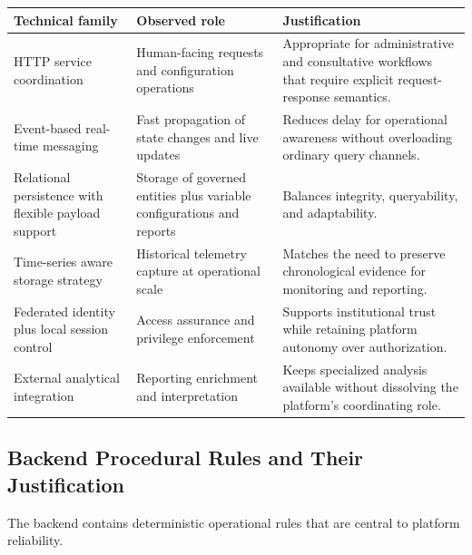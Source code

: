 \documentclass[11pt,a4paper]{article}
\begin{document}
\begin{longtable}{@{}p{}p{}p{}@{}}
\toprule
\textbf{Technical family} & \textbf{Observed role} & \textbf{Justification} \\
\midrule
\endhead
HTTP service coordination & Human-facing requests and configuration operations & Appropriate for administrative and consultative workflows that require explicit request-response semantics. \\
Event-based real-time messaging & Fast propagation of state changes and live updates & Reduces delay for operational awareness without overloading ordinary query channels. \\
Relational persistence with flexible payload support & Storage of governed entities plus variable configurations and reports & Balances integrity, queryability, and adaptability. \\
Time-series aware storage strategy & Historical telemetry capture at operational scale & Matches the need to preserve chronological evidence for monitoring and reporting. \\
Federated identity plus local session control & Access assurance and privilege enforcement & Supports institutional trust while retaining platform autonomy over authorization. \\
External analytical integration & Reporting enrichment and interpretation & Keeps specialized analysis available without dissolving the platform's coordinating role. \\
\bottomrule
\end{longtable}

\subsection{Backend Procedural Rules and Their Justification}
The backend contains deterministic operational rules that are central to platform reliability.
\end{document}
